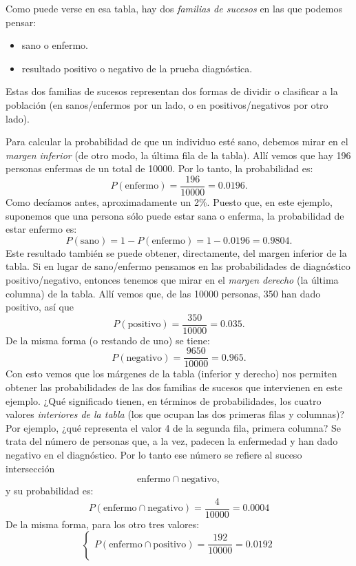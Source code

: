 \begin{ejemplo}
        Como puede verse en esa tabla, hay dos {\em familias de sucesos} en las que podemos pensar:
        \begin{itemize}
           \item sano o enfermo.
           \item resultado positivo o negativo de la prueba diagnóstica.
         \end{itemize}
        Estas dos familias de sucesos representan dos formas de dividir o clasificar a la población (en sanos/enfermos por un lado, o en positivos/negativos por otro lado).

        Para calcular la probabilidad de que un individuo esté sano, debemos mirar en el {\em margen inferior} (de otro modo, la última fila de la tabla). Allí vemos que hay 196 personas enfermas de un total de 10000. Por lo tanto, la probabilidad es:
        \[P(\mbox{enfermo})=\dfrac{196}{10000}=0.0196.\]
        Como decíamos antes, aproximadamente un 2\%. Puesto que, en este ejemplo, suponemos que una persona sólo puede estar sana o enferma, la probabilidad de estar enfermo es:
        \[P(\mbox{sano})=1-P(\mbox{enfermo})=1-0.0196=0.9804.\]
        Este resultado también se puede obtener, directamente, del margen inferior de la tabla. Si en lugar de sano/enfermo pensamos en las probabilidades de diagnóstico positivo/negativo, entonces tenemos que mirar en el {\em margen derecho} (la última columna) de la tabla. Allí vemos que, de las 10000 personas, 350 han dado positivo, así que
        \[P(\mbox{positivo})=\dfrac{350}{10000}=0.035.\]
        De la misma forma (o restando de uno) se tiene:
        \[P(\mbox{negativo})=\dfrac{9650}{10000}=0.965.\]
        Con esto vemos que los márgenes de la tabla (inferior y derecho) nos permiten obtener las probabilidades de las dos familias de sucesos que intervienen en este ejemplo. ¿Qué significado tienen, en términos de probabilidades, los cuatro valores {\em interiores de la tabla} (los que ocupan las dos primeras filas y columnas)? Por ejemplo, ¿qué representa el valor 4 de la segunda fila, primera columna? Se trata del número de personas que, a la vez, padecen la enfermedad y han dado negativo en el diagnóstico. Por lo tanto ese número se refiere al suceso intersección
        \[\mbox{enfermo}\cap\mbox{negativo},\]
        y su probabilidad es:
        \[P\left(\mbox{enfermo}\cap\mbox{negativo}\right)=\dfrac{4}{10000}=0.0004\]
        De la misma forma, para los otro tres valores:
        \[
        \begin{cases}
        P\left(\mbox{enfermo}\cap\mbox{positivo}\right)=\dfrac{192}{10000}=0.0192\\[5mm]

\end{cases}\]
\end{ejemplo}
